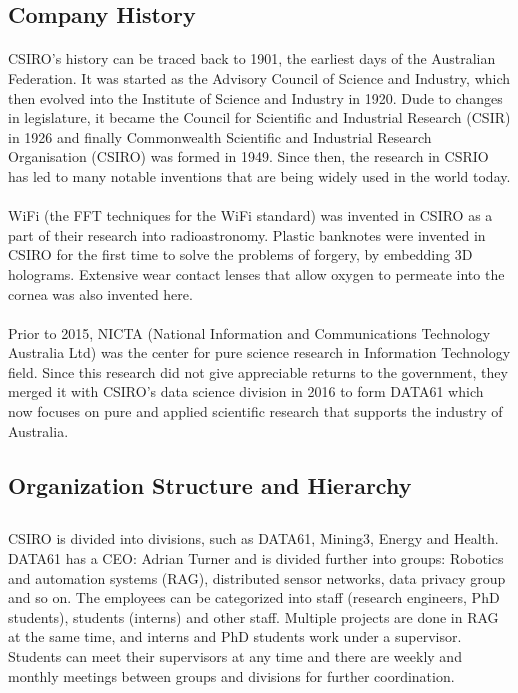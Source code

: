 \subsection{Company History}

\paragraph{}
CSIRO's history can be traced back to 1901, the earliest days of the Australian Federation. It was started as the Advisory Council of Science and Industry, which then evolved into the Institute of Science and Industry in 1920. Dude to changes in legislature, it became the Council for Scientific and Industrial Research (CSIR) in 1926 and finally Commonwealth Scientific and Industrial Research Organisation (CSIRO) was formed in 1949. Since then, the research in CSRIO has led to many notable inventions that are being widely used in the world today.

\paragraph{}
WiFi (the FFT techniques for the WiFi standard) was invented in CSIRO as a part of their research into radioastronomy. Plastic banknotes were invented in CSIRO for the first time to solve the problems of forgery, by embedding 3D holograms. Extensive wear contact lenses that allow oxygen to permeate into the cornea was also invented here. 

\paragraph{}
Prior to 2015, NICTA (National Information and Communications Technology Australia Ltd) was the center for pure science research in Information Technology field. Since this research did not give appreciable returns to the government, they merged it with CSIRO's data science division in 2016 to form DATA61 which now focuses on pure and applied scientific research that supports the industry of Australia.

\subsection{Organization Structure and Hierarchy}

\subsection{}
CSIRO is divided into divisions, such as DATA61, Mining3, Energy and Health. DATA61 has a CEO: Adrian Turner and is divided further into groups: Robotics and automation systems (RAG), distributed sensor networks, data privacy group and so on. The employees can be categorized into staff (research engineers, PhD students), students (interns) and other staff. Multiple projects are done in RAG at the same time, and interns and PhD students work under a supervisor. Students can meet their supervisors at any time and there are weekly and monthly meetings between groups and divisions for further coordination.

